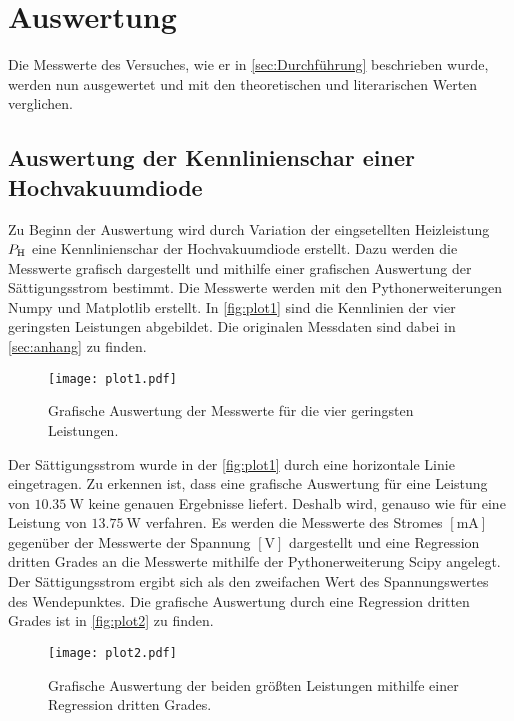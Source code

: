 \section{Auswertung}
\label{sec:Auswertung}

Die Messwerte des Versuches, wie er in \autoref{sec:Durchführung} beschrieben wurde, werden nun ausgewertet und mit den theoretischen und literarischen Werten verglichen.

\subsection{Auswertung der Kennlinienschar einer Hochvakuumdiode}
\label{subsec:kennL}
Zu Beginn der Auswertung wird durch Variation der eingsetellten Heizleistung $P_{\text H}$ eine Kennlinienschar der Hochvakuumdiode erstellt. Dazu werden die Messwerte grafisch dargestellt und mithilfe einer grafischen Auswertung der Sättigungsstrom bestimmt.
Die Messwerte werden mit den Pythonerweiterungen Numpy \cite{numpy} und Matplotlib \cite{matplotlib} erstellt.
In \autoref{fig:plot1} sind die Kennlinien der vier geringsten Leistungen abgebildet. Die originalen Messdaten sind dabei in \autoref{sec:anhang} zu finden.

\begin{figure}[H]
  \centering
  \texttt{[image: plot1.pdf]}
  \caption{Grafische Auswertung der Messwerte für die vier geringsten Leistungen.}
  \label{fig:plot1}
\end{figure}

\noindent
Der Sättigungsstrom wurde in der \autoref{fig:plot1} durch eine horizontale Linie eingetragen. 
Zu erkennen ist, dass eine grafische Auswertung für eine Leistung von $\SI{10,35}{\watt}$ keine genauen Ergebnisse liefert. Deshalb wird, genauso wie für eine Leistung von $\SI{13,75}{\watt}$ verfahren. \newline
Es werden die Messwerte des Stromes $[\si{\milli\ampere}]$ gegenüber der Messwerte der Spannung $[\si{\volt}]$ dargestellt und eine Regression dritten Grades an die Messwerte mithilfe der Pythonerweiterung
Scipy \cite{scipy} angelegt. Der Sättigungsstrom ergibt sich als den zweifachen Wert des Spannungswertes des Wendepunktes.
Die grafische Auswertung durch eine Regression dritten Grades ist in \autoref{fig:plot2} zu finden.

\begin{figure}[H]
  \centering
  \texttt{[image: plot2.pdf]}
  \caption{Grafische Auswertung der beiden größten Leistungen mithilfe einer Regression dritten Grades.}
  \label{fig:plot2}
\end{figure}

